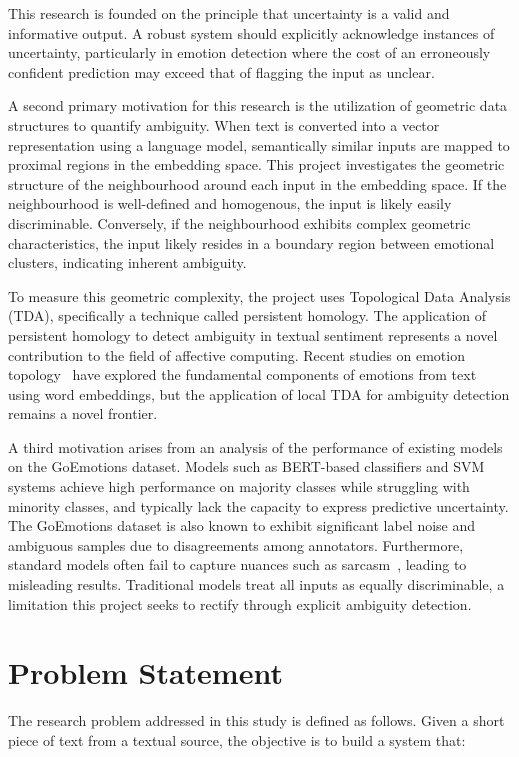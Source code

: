 This research is founded on the principle that uncertainty is a valid and informative output. A robust system should explicitly acknowledge instances of uncertainty, particularly in emotion detection where the cost of an erroneously confident prediction may exceed that of flagging the input as unclear.

A second primary motivation for this research is the utilization of geometric data structures to quantify ambiguity. When text is converted into a vector representation using a language model, semantically similar inputs are mapped to proximal regions in the embedding space. This project investigates the geometric structure of the neighbourhood around each input in the embedding space. If the neighbourhood is well-defined and homogenous, the input is likely easily discriminable. Conversely, if the neighbourhood exhibits complex geometric characteristics, the input likely resides in a boundary region between emotional clusters, indicating inherent ambiguity.

To measure this geometric complexity, the project uses Topological Data Analysis (TDA), specifically a technique called persistent homology. The application of persistent homology to detect ambiguity in textual sentiment represents a novel contribution to the field of affective computing. Recent studies on emotion topology~\cite{emotion_topology} have explored the fundamental components of emotions from text using word embeddings, but the application of local TDA for ambiguity detection remains a novel frontier.

A third motivation arises from an analysis of the performance of existing models on the
GoEmotions dataset. Models such as BERT-based classifiers and SVM systems achieve
high performance on majority classes while struggling with minority classes, and
typically lack the capacity to express predictive uncertainty. The GoEmotions dataset
is also known to exhibit significant label noise and ambiguous samples due to
disagreements among annotators. Furthermore, standard models often fail to capture nuances such as sarcasm~\cite{sarcasm}, leading to misleading results. Traditional models treat all inputs as equally discriminable, a limitation this project seeks to rectify through explicit ambiguity detection.

\section{Problem Statement}
 
The research problem addressed in this study is defined as follows. Given a short piece of text
from a textual source, the objective is to build a system that:
 
